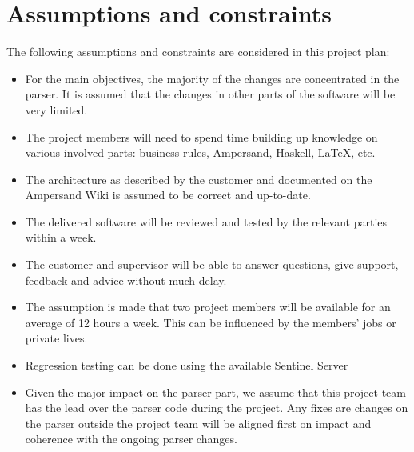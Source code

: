 \section{Assumptions and constraints}
\label{sec:assumptions-constraints}
The following assumptions and constraints are considered in this project plan:
\begin{itemize}
	\item For the main objectives, the majority of the changes are concentrated in the parser.
		It is assumed that the changes in other parts of the software will be very limited.
	\item The project members will need to spend time building up knowledge on various involved parts:
		business rules, Ampersand, Haskell, LaTeX, etc.
	\item The architecture as described by the customer and documented on the Ampersand Wiki is assumed to be correct and up-to-date.
	\item The delivered software will be reviewed and tested by the relevant parties within a week.
	\item The customer and supervisor will be able to answer questions, give support, feedback and advice without much delay.
	\item The assumption is made that two project members will be available for an average of 12 hours a week.
		This can be influenced by the members' jobs or private lives.
	\item Regression testing can be done using the available Sentinel Server
	\item Given the major impact on the parser part, we assume that this project team has the lead over the parser code during the project.
		Any fixes are changes on the parser outside the project team will be aligned first on impact and coherence with the ongoing parser changes.
\end{itemize}
